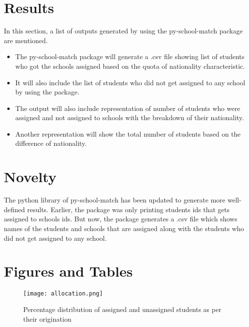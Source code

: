 \documentclass[twocolumn]{bmcart}
\begin{document}
		
		\section*{Results}
		\vspace{\baselineskip}
		In this section, a list of outputs generated by using the py-school-match package are mentioned.\vspace{\baselineskip}
		
		\begin{itemize}
			\vspace{-0.4cm}\item The py-school-match package will generate a .csv file showing list of students who got the schools assigned based on the quota of nationality characteristic. \vspace{\baselineskip}
			\vspace{-0.4cm}\item It will also include the list of students who did not get assigned to any school by using the package. \vspace{\baselineskip}
			\vspace{-0.4cm}\item The output will also include representation of number of students who were assigned and not assigned to schools with the breakdown of their nationality. \vspace{\baselineskip}
			\vspace{-0.4cm}\item Another representation will show the total number of students based on the difference of nationality. \vspace{\baselineskip}
		\end{itemize}
		
		\section*{Novelty}
		
		The python library of py-school-match has been updated to generate more well-defined results. Earlier, the package was only printing students ids that gets assigned to schools ids. But now, the package generates a .csv file which shows names of the students and schools that are assigned along with the students who did not get assigned to any school.
		
		\section*{Figures and Tables}
		\begin{figure}[h!]
			\centering
                        \texttt{[image: allocation.png]}
			\caption{Percentage distribution of assigned and unassigned students as per their origination}
			\label{fig:Distribution}
		\end{figure}
		
\end{document}
